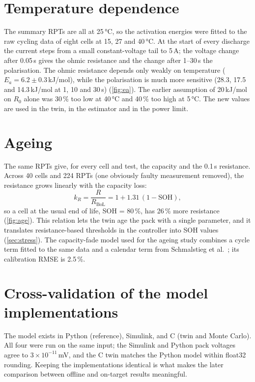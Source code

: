 \section{Temperature dependence}\label{sec:ea}
The summary RPTs are all at 25\,°C, so the activation energies were fitted to the raw cycling data of eight cells at 15, 27 and 40\,°C. At the start of every discharge the current steps from a small constant-voltage tail to 5\,A; the voltage change after 0.05\,s gives the ohmic resistance and the change after 1--30\,s the polarisation. The ohmic resistance depends only weakly on temperature ($E_a = 6.2 \pm 0.3$\,kJ/mol), while the polarisation is much more sensitive (28.3, 17.5 and 14.3\,kJ/mol at 1, 10 and 30\,s) (\cref{fig:ea}). The earlier assumption of 20\,kJ/mol on $R_0$ alone was 30\,\% too low at 40\,°C and 40\,\% too high at 5\,°C. The new values are used in the twin, in the estimator and in the power limit.


\section{Ageing}\label{sec:ageing}
The same RPTs give, for every cell and test, the capacity and the 0.1\,s resistance. Across 40 cells and 224 RPTs (one obviously faulty measurement removed), the resistance grows linearly with the capacity loss:
\begin{equation}
  k_R = \frac{R}{R_\mathrm{BoL}} = 1 + 1.31\,(1 - \mathrm{SOH}),
\end{equation}
so a cell at the usual end of life, SOH = 80\,\%, has 26\,\% more resistance (\cref{fig:age}). This relation lets the twin age the pack with a single parameter, and it translates resistance-based thresholds in the controller into SOH values (\cref{sec:stress}). The capacity-fade model used for the ageing study combines a cycle term fitted to the same data and a calendar term from Schmalstieg et al.\ \citep{schmalstieg2014,millner2010}; its calibration RMSE is 2.5\,\%. 


\section{Cross-validation of the model implementations}
The model exists in Python (reference), Simulink, and C (twin and Monte Carlo). All four were run on the same input; the Simulink and Python pack voltages agree to $3\times10^{-11}$\,mV, and the C twin matches the Python model within float32 rounding. Keeping the implementations identical is what makes the later comparison between offline and on-target results meaningful.
